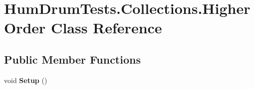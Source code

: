 \hypertarget{classHumDrumTests_1_1Collections_1_1HigherOrder}{}\section{Hum\+Drum\+Tests.\+Collections.\+Higher\+Order Class Reference}
\label{classHumDrumTests_1_1Collections_1_1HigherOrder}
\subsection*{Public Member Functions}
\begin{DoxyCompactItemize}
\item 
void {\bfseries Setup} ()\hypertarget{classHumDrumTests_1_1Collections_1_1HigherOrder_ac1ca02135dac3cd5e3d6b99cf932e27d}{}\label{classHumDrumTests_1_1Collections_1_1HigherOrder_ac1ca02135dac3cd5e3d6b99cf932e27d}


\end{DoxyCompactItemize}
